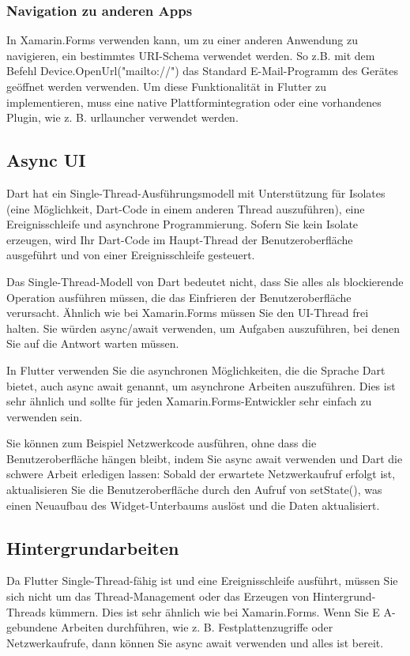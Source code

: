 \subsubsection{Navigation zu anderen Apps}
In Xamarin.Forms verwenden kann, um zu einer anderen Anwendung zu navigieren, ein bestimmtes URI-Schema verwendet werden.  So z.B. mit dem Befehl Device.OpenUrl("mailto://") das Standard E-Mail-Programm des Gerätes geöffnet werden verwenden.
Um diese Funktionalität in Flutter zu implementieren,  muss eine native Plattformintegration oder eine vorhandenes Plugin, wie z. B. urllauncher verwendet werden.  
\subsection{Async UI}
Dart hat ein Single-Thread-Ausführungsmodell mit Unterstützung für Isolates (eine Möglichkeit, Dart-Code in einem anderen Thread auszuführen), eine Ereignisschleife und asynchrone Programmierung. Sofern Sie kein Isolate erzeugen, wird Ihr Dart-Code im Haupt-Thread der Benutzeroberfläche ausgeführt und von einer Ereignisschleife gesteuert.

Das Single-Thread-Modell von Dart bedeutet nicht, dass Sie alles als blockierende Operation ausführen müssen, die das Einfrieren der Benutzeroberfläche verursacht. Ähnlich wie bei Xamarin.Forms müssen Sie den UI-Thread frei halten. Sie würden async/await verwenden, um Aufgaben auszuführen, bei denen Sie auf die Antwort warten müssen.

In Flutter verwenden Sie die asynchronen Möglichkeiten, die die Sprache Dart bietet, auch async await genannt, um asynchrone Arbeiten auszuführen. Dies ist \Csharp sehr ähnlich und sollte für jeden Xamarin.Forms-Entwickler sehr einfach zu verwenden sein.

Sie können zum Beispiel Netzwerkcode ausführen, ohne dass die Benutzeroberfläche hängen bleibt, indem Sie async await verwenden und Dart die schwere Arbeit erledigen lassen:
Sobald der erwartete Netzwerkaufruf erfolgt ist, aktualisieren Sie die Benutzeroberfläche durch den Aufruf von setState(), was einen Neuaufbau des Widget-Unterbaums auslöst und die Daten aktualisiert.
\subsection{Hintergrundarbeiten}
Da Flutter Single-Thread-fähig ist und eine Ereignisschleife ausführt, müssen Sie sich nicht um das Thread-Management oder das Erzeugen von Hintergrund-Threads kümmern. Dies ist sehr ähnlich wie bei Xamarin.Forms. Wenn Sie E A-gebundene Arbeiten durchführen, wie z. B. Festplattenzugriffe oder Netzwerkaufrufe, dann können Sie async await verwenden und alles ist bereit.

